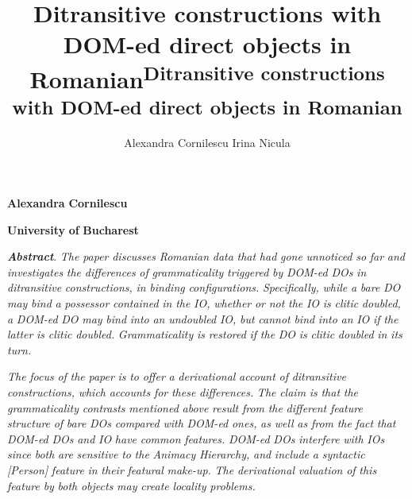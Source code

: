 \documentclass[output=paper,modfonts,nonflat]{langsci/langscibook}
\author{Alexandra Cornilescu\affiliation{}\lastand 
Irina Nicula\affiliation{}}
\title{Ditransitive constructions with DOM-ed direct objects in Romanian}
\begin{document}
\maketitle 

\title{\textsuperscript{Ditransitive constructions with DOM-ed direct objects in Romanian}}

\textbf{Alexandra} \textbf{Cornilescu}

\textbf{University} \textbf{of} \textbf{Bucharest}

\textbf{\textit{Abstract}}. \textit{The} \textit{paper} \textit{discusses} \textit{Romanian} \textit{data} \textit{that} \textit{had} \textit{gone} \textit{unnoticed} \textit{so} \textit{far} \textit{and} \textit{investigates} \textit{the} \textit{differences} \textit{of} \textit{grammaticality} \textit{triggered} \textit{by} \textit{DOM-ed} \textit{DOs} \textit{in} \textit{ditransitive} \textit{constructions,} \textit{in} \textit{binding} \textit{configurations.} \textit{Specifically,} \textit{while} \textit{a} \textit{bare} \textit{DO} \textit{may} \textit{bind} \textit{a} \textit{possessor} \textit{contained} \textit{in} \textit{the} \textit{IO,} \textit{whether} \textit{or} \textit{not} \textit{the} \textit{IO} \textit{is} \textit{clitic} \textit{doubled,} \textit{a} \textit{DOM-ed} \textit{DO} \textit{may} \textit{bind} \textit{into} \textit{an} \textit{undoubled} \textit{IO,} \textit{but} \textit{cannot} \textit{bind} \textit{into} \textit{an} \textit{IO} \textit{if} \textit{the} \textit{latter} \textit{is} \textit{clitic} \textit{doubled.} \textit{Grammaticality} \textit{is} \textit{restored} \textit{if} \textit{the} \textit{DO} \textit{is} \textit{clitic} \textit{doubled} \textit{in} \textit{its} \textit{turn.}

\textit{The} \textit{focus} \textit{of} \textit{the} \textit{paper} \textit{is} \textit{to} \textit{offer} \textit{a} \textit{derivational} \textit{account} \textit{of} \textit{ditransitive} \textit{constructions,} \textit{which} \textit{accounts} \textit{for} \textit{these} \textit{differences.} \textit{The} \textit{claim} \textit{is} \textit{that} \textit{the} \textit{grammaticality} \textit{contrasts} \textit{mentioned} \textit{above} \textit{result} \textit{from} \textit{the} \textit{different} \textit{feature} \textit{structure} \textit{of} \textit{bare} \textit{DOs} \textit{compared} \textit{with} \textit{DOM-ed} \textit{ones,} \textit{as} \textit{well} \textit{as} \textit{from} \textit{the} \textit{fact} \textit{that} \textit{DOM-ed} \textit{DOs} \textit{and} \textit{IO} \textit{have} \textit{common} \textit{features.} \textit{DOM-ed} \textit{DOs} \textit{interfere} \textit{with} \textit{IOs} \textit{since} \textit{both} \textit{are} \textit{sensitive} \textit{to} \textit{the} \textit{Animacy} \textit{Hierarchy,} \textit{and} \textit{include} \textit{a} \textit{syntactic} \textit{[Person]} \textit{feature} \textit{in} \textit{their} \textit{featural} \textit{make-up.} \textit{The} \textit{derivational} \textit{valuation} \textit{of} \textit{this} \textit{feature} \textit{by} \textit{both} \textit{objects} \textit{may} \textit{create} \textit{locality} \textit{problems.}
\end{document}
